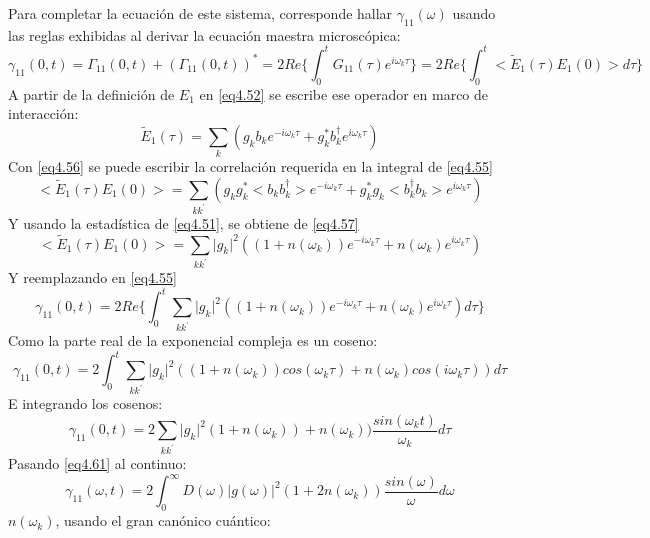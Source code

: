 \documentclass{book}
\begin{document}
 Para completar la ecuación de este sistema, corresponde hallar $\gamma_{11}(\omega)$ usando las reglas exhibidas al derivar la ecuación maestra microscópica:
 \begin{equation}\label{eq4.55}\gamma_{11}(0,t)=\Gamma_{11}(0,t)+(\Gamma_{11}(0,t))^*=2Re\{\int_0^t G_{11}(\tau)e^{i\omega_k \tau}\}=2Re\{\int_0^t <\tilde{E}_1(\tau)E_1(0)>d\tau\}\end{equation}
A partir de la definición de $E_1$ en \ref{eq4.52} se escribe ese operador en marco de interacción:
\begin{equation}\label{eq4.56}\tilde{E}_1(\tau)=\sum_k(g_kb_ke^{-i\omega_k\tau}+g_k^*b_k^\dag e^{i\omega_k\tau})\end{equation}
Con \ref{eq4.56} se puede escribir la correlación requerida en la integral de \ref{eq4.55} \begin{equation}\label{eq4.57}<\tilde{E}_1(\tau)E_1(0)>=\sum_{kk^\prime}(g_kg_k^*<b_kb_k^\dag>e^{-i\omega_k\tau}+g_k^*g_k<b_k^\dag b_k> e^{i\omega_k\tau})\end{equation}
Y usando la estadística de \ref{eq4.51}, se obtiene de \ref{eq4.57}
 \begin{equation}\label{eq4.58}<\tilde{E}_1(\tau)E_1(0)>=\sum_{kk^\prime}\lvert g_k\rvert^2((1+n(\omega_k))e^{-i\omega_k\tau}+n(\omega_k) e^{i\omega_k\tau})\end{equation}
 Y reemplazando en \ref{eq4.55}
 \begin{equation}\label{eq4.59}\gamma_{11}(0,t)=2Re\{\int_0^t \sum_{kk^\prime}\lvert g_k\rvert^2((1+n(\omega_k))e^{-i\omega_k\tau}+n(\omega_k) e^{i\omega_k\tau}) d\tau\}\end{equation}
 Como la parte real de la exponencial compleja es un coseno:
  \begin{equation}\label{eq4.60}\gamma_{11}(0,t)=2 \int_0^t \sum_{kk^\prime}\lvert g_k\rvert^2((1+n(\omega_k))cos(\omega_k\tau)+n(\omega_k) cos(i\omega_k\tau)) d\tau\end{equation}
  E integrando los cosenos:
\begin{equation}\label{eq4.61}\gamma_{11}(0,t)=2\sum_{kk^\prime}\lvert g_k\rvert^2(1+n(\omega_k))+n(\omega_k))\frac{sin(\omega_k t)}{\omega_k} d\tau\end{equation}
Pasando \ref{eq4.61} al continuo:
\begin{equation}\label{eq4.62}\gamma_{11}(\omega,t)=2\int_0^\infty D(\omega)\lvert g(\omega)\rvert^2(1+2n(\omega_k))\frac{sin(\omega)}{\omega} d\omega\end{equation}
$n(\omega_k)$, usando el gran canónico cuántico:
\end{document}
